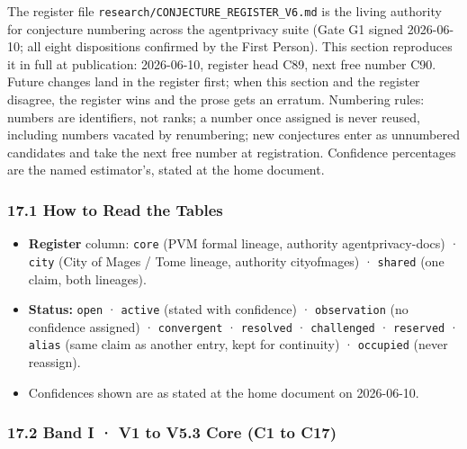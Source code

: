 \documentclass[
  11pt,
]{article}
\providecommand{\tightlist}{%
  \setlength{\itemsep}{0pt}\setlength{\parskip}{0pt}}
\begin{document}
The register file \texttt{research/CONJECTURE\_REGISTER\_V6.md} is the
living authority for conjecture numbering across the agentprivacy suite
(Gate G1 signed 2026-06-10; all eight dispositions confirmed by the
First Person). This section reproduces it in full at publication:
2026-06-10, register head C89, next free number C90. Future changes land
in the register first; when this section and the register disagree, the
register wins and the prose gets an erratum. Numbering rules: numbers
are identifiers, not ranks; a number once assigned is never reused,
including numbers vacated by renumbering; new conjectures enter as
unnumbered candidates and take the next free number at registration.
Confidence percentages are the named estimator's, stated at the home
document.

\subsubsection{17.1 How to Read the
Tables}\label{how-to-read-the-tables}

\begin{itemize}
\tightlist
\item
  \textbf{Register} column: \texttt{core} (PVM formal lineage, authority
  agentprivacy-docs) · \texttt{city} (City of Mages / Tome lineage,
  authority cityofmages) · \texttt{shared} (one claim, both lineages).
\item
  \textbf{Status:} \texttt{open} · \texttt{active} (stated with
  confidence) · \texttt{observation} (no confidence assigned) ·
  \texttt{convergent} · \texttt{resolved} · \texttt{challenged} ·
  \texttt{reserved} · \texttt{alias} (same claim as another entry, kept
  for continuity) · \texttt{occupied} (never reassign).
\item
  Confidences shown are as stated at the home document on 2026-06-10.
\end{itemize}

\subsubsection{17.2 Band I · V1 to V5.3 Core (C1 to
C17)}\label{band-i-v1-to-v5.3-core-c1-to-c17}
\end{document}
